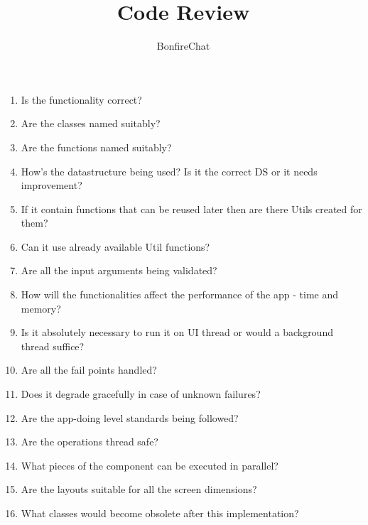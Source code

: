 \documentclass[accentcolor=tud2d,12pt,paper=a4,colorbacktitle]{tudexercise}
\title{Code Review}
\subtitle{BonfireChat}
\begin{document}
  \maketitle

  \begin{enumerate}[ 1.]
    \item Is the functionality correct?
    \item Are the classes named suitably?
    \item Are the functions named suitably?
    \item How's the datastructure being used? Is it the correct DS or it needs improvement?
    \item If it contain functions that can be reused later then are there Utils created for them?
    \item Can it use already available Util functions?
    \item Are all the input arguments being validated?
    \item How will the functionalities affect the performance of the app - time and memory?
    \item Is it absolutely necessary to run it on UI thread or would a background thread suffice?
    \item Are all the fail points handled?
    \item Does it degrade gracefully in case of unknown failures?
    \item Are the app-doing level standards being followed?
    \item Are the operations thread safe?
    \item What pieces of the component can be executed in parallel?
    \item Are the layouts suitable for all the screen dimensions?
    \item What classes would become obsolete after this implementation?
  \end{enumerate}
\end{document}
